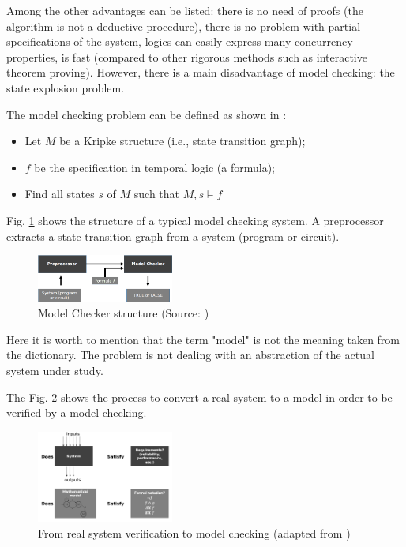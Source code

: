 \documentclass[journal]{IEEEtran}
\begin{document}
Among the other advantages can be listed: there is no need of proofs (the algorithm is not a deductive procedure), there is no problem with partial specifications of the system, logics can easily express many concurrency properties, is fast (compared to other rigorous methods such as interactive theorem proving). However, there is a main disadvantage of model checking: the state explosion problem. 

The model checking problem can be defined as shown in \cite{Clarke2008}: 

\begin{itemize}
\item Let $M$ be a Kripke structure (i.e., state transition graph);
\item $f$ be the specification in temporal logic (a formula);
\item Find all states $s$ of $M$ such that $M , s \models f$
\end{itemize}

Fig. \ref{fig:modelcheckstruc} shows the structure of a typical model checking system. A preprocessor extracts a state transition graph from a system (program or circuit).

\begin{figure}[h]
\includegraphics[width=0.4\textwidth]{modelcheckstruc}
\centering
\caption{Model Checker structure (Source: \cite{Clarke2008})}
\label{fig:modelcheckstruc}
\end{figure}

Here it is worth to mention that the term "model" is not the meaning taken from the dictionary. The problem is not dealing with an abstraction of the actual system under study. 

The Fig. \ref{fig:systemverif} shows the process to convert a real system to a model in order to be verified by a model checking. 

\begin{figure}[h]
\includegraphics[width=0.4\textwidth]{systemverif}
\centering
\caption{From real system verification to model checking (adapted from \cite{Clarke2008})}
\label{fig:systemverif}
\end{figure}
\end{document}
